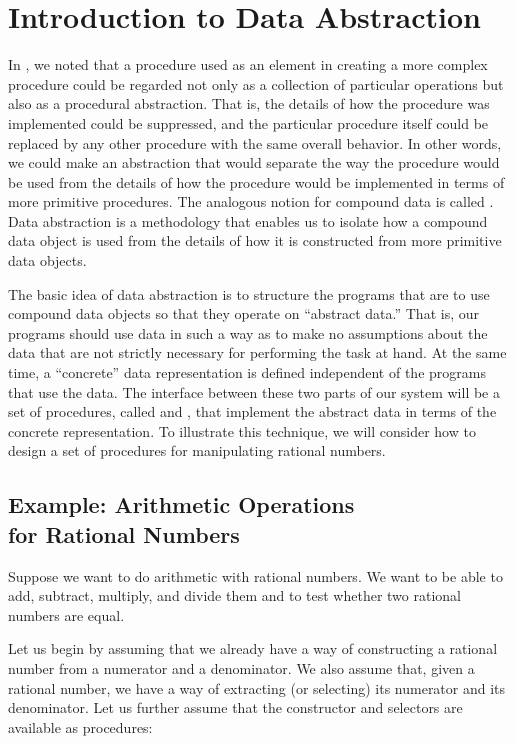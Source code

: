 \section{Introduction to Data Abstraction}
\label{Section 2.1}

In , we noted that a procedure used as an element in
creating a more complex procedure could be regarded not only as a collection of
particular operations but also as a procedural abstraction.  That is, the
details of how the procedure was implemented could be suppressed, and the
particular procedure itself could be replaced by any other procedure with the
same overall behavior.  In other words, we could make an abstraction that would
separate the way the procedure would be used from the details of how the
procedure would be implemented in terms of more primitive procedures.  The
analogous notion for compound data is called .  Data
abstraction is a methodology that enables us to isolate how a compound data
object is used from the details of how it is constructed from more primitive
data objects.

The basic idea of data abstraction is to structure the programs that are to use
compound data objects so that they operate on ``abstract data.'' That is, our
programs should use data in such a way as to make no assumptions about the data
that are not strictly necessary for performing the task at hand.  At the same
time, a ``concrete'' data representation is defined independent of the programs
that use the data.  The interface between these two parts of our system will be
a set of procedures, called  and ,
that implement the abstract data in terms of the concrete representation.  To
illustrate this technique, we will consider how to design a set of procedures
for manipulating rational numbers.



\subsection{Example: Arithmetic Operations\\ for Rational Numbers}
\label{Section 2.1.1}

Suppose we want to do arithmetic with rational numbers.  We want to be able to
add, subtract, multiply, and divide them and to test whether two rational
numbers are equal.

Let us begin by assuming that we already have a way of constructing a rational
number from a numerator and a denominator.  We also assume that, given a
rational number, we have a way of extracting (or selecting) its numerator and
its denominator.  Let us further assume that the constructor and selectors are
available as procedures:

